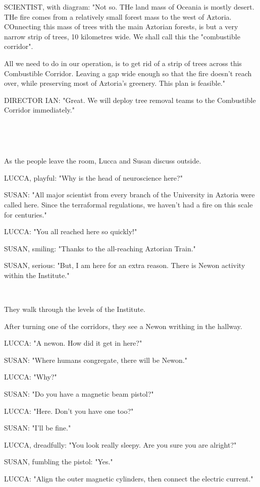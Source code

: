 \documentclass[11pt]{article}
\begin{document}
SCIENTIST, with diagram: "Not so.
THe land mass of Oceania is mostly desert.
THe fire comes from a relatively small forest mass to the west of Aztoria.
COnnecting this mass of trees with the main Aztorian forests, is but a very narrow strip of trees, 10 kilometres wide. 
We shall call this the "combustible corridor".

All we need to do in our operation, is to get rid of a strip of trees across this Combustible Corridor.
Leaving a gap wide enough so that the fire doesn't reach over, while preserving most of Aztoria's greenery.
This plan is feasible."

DIRECTOR IAN: "Great. We will deploy tree removal teams to the Combustible Corridor immediately."

\ 

\ 

As the people leave the room, Lucca and Susan discuss outside. 

LUCCA, playful: "Why is the head of neuroscience here?"

SUSAN: "All major scientist from every branch of the University in Aztoria were called here. 
Since the terraformal regulations, we haven't had a fire on this scale for centuries."

LUCCA: "You all reached here so quickly!"

SUSAN, smiling: "Thanks to the all-reaching Aztorian Train."

SUSAN, serious: "But, I am here for an extra reason.
There is Newon activity within the Institute."

\ 

They walk through the levels of the Institute. 

After turning one of the corridors, they see a Newon writhing in the hallway.

LUCCA: "A newon. How did it get in here?"

SUSAN: "Where humans congregate, there will be Newon."

LUCCA: "Why?"

SUSAN: "Do you have a magnetic beam pistol?"

LUCCA: "Here. 
Don't you have one too?"

SUSAN: "I'll be fine."

LUCCA, dreadfully: "You look really sleepy.
Are you sure you are alright?"

SUSAN, fumbling the pistol: "Yes."

LUCCA: "Align the outer magnetic cylinders, then connect the electric current."
\end{document}
